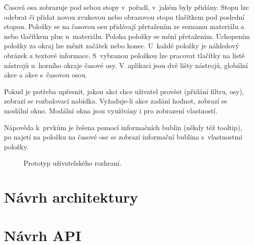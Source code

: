 Časová osa zobrazuje pod sebou stopy v~pořadí, v~jakém byly přidány. Stopu lze odebrat či přidat novou zvukovou nebo obrazovou stopu tlačítkem pod poslední stopou. Položky se na časovou osu přidávají přetažením ze seznamu materiálu a nebo tlačítkem plus u~materiálu. Poloha položky se mění přetažením. Uchopením položky za okraj lze měnit začátek nebo konec. U~každé položky je náhledový obrázek a textové informace. S~vybranou položkou lze pracovat tlačítky na listě nástrojů u~horního okraje časové osy. V~aplikaci jsou dvě lišty nástrojů, globální akce a akce s~časovou osou. 

Pokud je potřeba upřesnit, jakou akci chce uživatel provést (přidání filtru, osy), zobrazí se rozbalovací nabídka. Vyžaduje-li akce zadání hodnot, zobrazí se modální okno. Modální okna jsou využívány i pro zobrazení vlastností.

Nápověda k~prvkům je řešena pomocí informačních bublin (někdy též tooltip), po najetí na položku na časové ose se zobrazí informační bublina s~vlastnostmi položky.

\begin{figure}[h]
	\centering
	\caption{Prototyp uživatelského rozhraní.}\label{img:mockup}
\end{figure}

\section{Návrh architektury}

\section{Návrh API}

